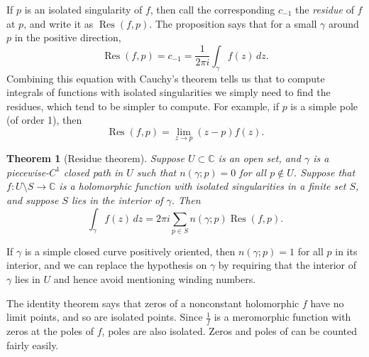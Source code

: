 \documentclass[12pt,openany]{book}
\newcommand{\C}{{\mathbb{C}}}
\newcommand{\myindex}[1]{#1\index{#1}}
\theoremstyle{plain}
\newtheorem{thm}{Theorem}[section]
\theoremstyle{remark}
\theoremstyle{definition}
\theoremstyle{exercise}
\theoremstyle{example}
\begin{document}
\pagebreak[3]
If $p$ is an isolated singularity of $f$, then call the corresponding
$c_{-1}$ the \emph{\myindex{residue}} of $f$ at $p$, and write it
as $\operatorname{Res}(f,p)$.
The proposition says that for a small $\gamma$ around $p$ in the positive direction,
\begin{equation*}
\operatorname{Res}(f,p) = c_{-1} = \frac{1}{2\pi i} \int_\gamma f(z) \, dz
.
\end{equation*}
Combining this equation with Cauchy's theorem tells us that to compute
integrals of functions with isolated singularities we simply need to find
the residues,
which tend to be simpler to
compute.  For example, if $p$ is a simple pole (of order 1), then
\begin{equation*}
\operatorname{Res}(f,p) = \lim_{z \to p} (z-p)f(z) .
\end{equation*}

\begin{thm}[Residue theorem]\label{thm:residue}
Suppose $U \subset \C$ is an open set, and $\gamma$ is a piecewise-$C^1$
closed path in $U$
such that $n(\gamma;p)=0$ for all $p \not\in U$.
Suppose that $f \colon U \setminus S \to \C$ is a holomorphic function with isolated
singularities in a finite set $S$, and suppose $S$ lies in the interior of $\gamma$.
Then
\begin{equation*}
\int_{\gamma} f(z) \, dz = 2\pi i \sum_{p \in S} n(\gamma;p) \operatorname{Res}(f,p) .
\end{equation*}
\end{thm}

If $\gamma$ is a simple closed curve positively oriented,
then $n(\gamma;p)=1$ for all $p$ in
its interior, and we can replace the hypothesis on $\gamma$
by requiring that the interior of $\gamma$ lies in $U$ and hence avoid
mentioning winding numbers.

The identity theorem says that zeros of a nonconstant holomorphic $f$
have no limit points, and so are isolated points.
Since $\frac{1}{f}$ is a meromorphic
function with zeros at the poles of $f$, poles are also
isolated.  Zeros and poles of  can be counted fairly easily.
\end{document}
